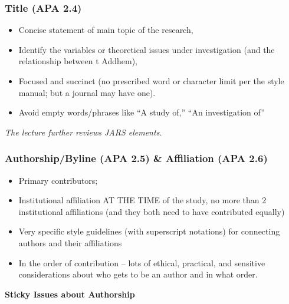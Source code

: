 \documentclass[
  11pt,
]{book}
\providecommand{\tightlist}{%
  \setlength{\itemsep}{0pt}\setlength{\parskip}{0pt}}
\begin{document}
\hypertarget{title-apa-2.4}{%
\subsubsection{Title (APA 2.4)}\label{title-apa-2.4}}

\begin{itemize}
\tightlist
\item
  Concise statement of main topic of the research,
\item
  Identify the variables or theoretical issues under investigation (and the relationship between t Addhem),
\item
  Focused and succinct (no prescribed word or character limit per the style manual; but a journal may have one).
\item
  Avoid empty words/phrases like ``A study of,'' ``An investigation of''
\end{itemize}

\emph{The lecture further reviews JARS elements.}

\hypertarget{authorshipbyline-apa-2.5-affiliation-apa-2.6}{%
\subsubsection{Authorship/Byline (APA 2.5) \& Affiliation (APA 2.6)}\label{authorshipbyline-apa-2.5-affiliation-apa-2.6}}

\begin{itemize}
\tightlist
\item
  Primary contributors;
\item
  Institutional affiliation AT THE TIME of the study, no more than 2 institutional affiliations (and they both need to have contributed equally)
\item
  Very specific style guidelines (with superscript notations) for connecting authors and their affiliations
\item
  In the order of contribution -- lots of ethical, practical, and sensitive considerations about who gets to be an author and in what order.
\end{itemize}

\textbf{Sticky Issues about Authorship}
\end{document}
